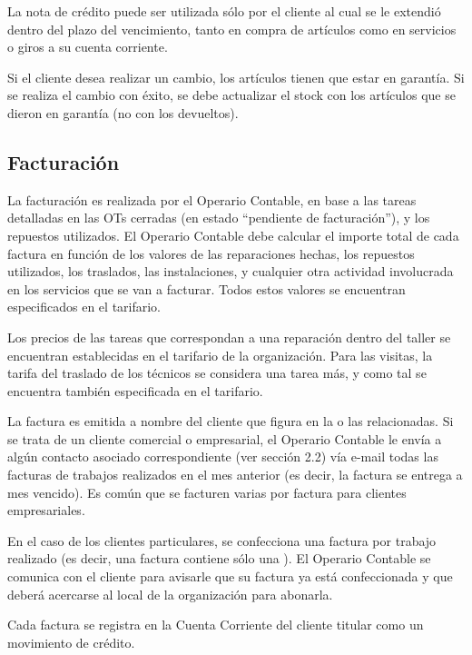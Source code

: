 \documentclass[12pt]{extarticle}
\begin{document}
\begin{spacing}{1.2}
    La nota de crédito puede ser utilizada sólo por el cliente al cual se le extendió dentro del plazo del vencimiento, tanto en compra de artículos como en servicios o giros a su cuenta corriente.

    Si el cliente desea realizar un cambio, los artículos tienen que estar en garantía. Si se realiza el cambio con éxito, se debe actualizar el stock con los artículos que se dieron en garantía (no con los devueltos).

    \subsection{Facturación}


    La facturación es realizada por el Operario Contable, en base a las tareas detalladas en las OTs{} cerradas (en estado ``pendiente de facturación''), y los repuestos utilizados. El Operario Contable debe calcular el importe total de cada factura en función de los valores de las reparaciones hechas, los repuestos utilizados, los traslados, las instalaciones, y cualquier otra actividad involucrada en los servicios que se van a facturar. Todos estos valores se encuentran especificados en el tarifario.
    
    Los precios de las tareas que correspondan a una reparación dentro del taller se encuentran establecidas en el tarifario de la organización. Para las visitas, la tarifa del traslado de los técnicos se considera una tarea más, y como tal se encuentra también especificada en el tarifario.

    La factura es emitida a nombre del cliente que figura en la o las \OTs{} relacionadas. Si se trata de un cliente comercial o empresarial, el Operario Contable le envía a algún contacto asociado correspondiente (ver sección 2.2) vía e-mail todas las facturas de trabajos realizados en el mes anterior (es decir, la factura se entrega a mes vencido). Es común que se facturen varias \OTs{} por factura para clientes empresariales.
    
    En el caso de los clientes particulares, se confecciona una factura por trabajo realizado (es decir, una factura contiene sólo una \OT{}). El Operario Contable se comunica con el cliente para avisarle que su factura ya está confeccionada y que deberá acercarse al local de la organización para abonarla.
   
    Cada factura se registra en la Cuenta Corriente del cliente titular como un movimiento de crédito. \\


\end{spacing}
\end{document}
